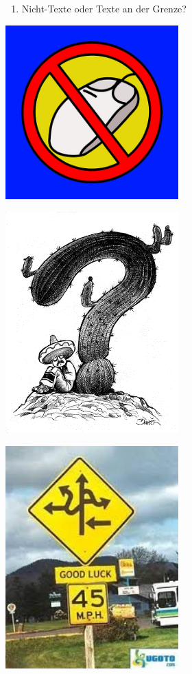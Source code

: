 \documentclass[
  letterpaper,
  DIV=11,
  numbers=noendperiod]{scrreprt}
\providecommand{\tightlist}{%
  \setlength{\itemsep}{0pt}\setlength{\parskip}{0pt}}\usepackage{longtable,booktabs,array}
\begin{document}
\begin{enumerate}
\def\labelenumi{(\arabic{enumi})}
\tightlist
\item
  Nicht-Texte oder Texte an der Grenze?
\end{enumerate}

\includegraphics[width=0.5\textwidth,height=\textheight]{./pictures/textkriterien_1.png}

\includegraphics[width=0.5\textwidth,height=\textheight]{./pictures/textkriterien_2.png}

\includegraphics[width=0.5\textwidth,height=\textheight]{./pictures/textkriterien_5.jpg}
\end{document}
